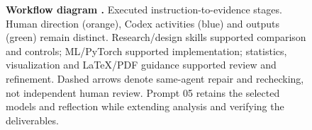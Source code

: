 \begin{figure}[H]
\par\smallskip{}\label{fig:ai-workflow}
{\small\textbf{Workflow diagram \theworkflowdiagram.}
Executed instruction-to-evidence stages. Human direction (orange), Codex activities
(blue) and outputs (green) remain distinct. Research/design skills supported comparison
and controls; ML/PyTorch supported implementation; statistics, visualization and
LaTeX/PDF guidance supported review and refinement. Dashed arrows denote same-agent
repair and rechecking, not independent human review. Prompt 05 retains the selected
models and reflection while extending analysis and verifying the deliverables.}
\end{figure}
